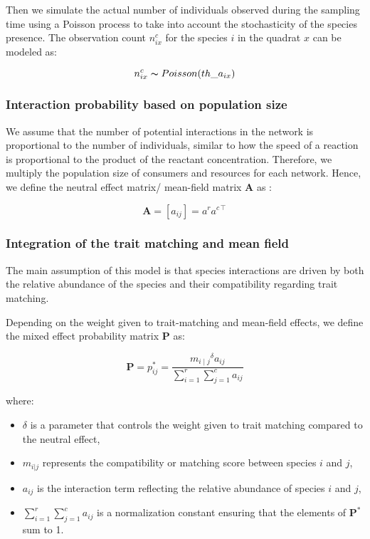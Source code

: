 Then we simulate the actual number of individuals observed during the sampling time using a Poisson process to take into account the stochasticity of the species presence. The observation count $n_{ix}^c$ for the species $i$ in the quadrat $x$ can be modeled as:

$$
    n_{ix}^c \thicksim Poisson(th\_a_{ix})
$$

\subsubsection{Interaction probability based on population size}

We assume that the number of potential interactions in the network is proportional to the number of individuals, similar to how the speed of a reaction is proportional to the product of the reactant concentration. Therefore, we multiply the population size of consumers and resources for each network. 
Hence, we define the neutral effect matrix/ mean-field matrix $\mathbf{A}$ as : 

$$
    \mathbf{A} = [a_{ij}] = a^r a^{c\intercal}
$$

\subsubsection{Integration of the trait matching and mean field}

The main assumption of this model is that species interactions are driven by both the relative abundance of the species and their compatibility regarding trait matching.

Depending on the weight given to trait-matching and mean-field effects, we define the mixed effect probability matrix $\mathbf{P}$ as: 

$$
    \mathbf{P} = p^*_{ij} = \frac{{m_{i\mid j}}^\delta a_{ij}}{\sum_{i=1}^{r} \sum_{j=1}^{c}a_{ij}}
$$
    
where:
\begin{itemize}
\item  $\delta$ is a parameter that controls the weight given to trait matching compared to the neutral effect,
\item  $m_{i|j}$ represents the compatibility or matching score between species \(i\) and \(j\),
\item  $a_{ij}$ is the interaction term reflecting the relative abundance of species \(i\) and \(j\),
\item  $\sum_{i=1}^{r} \sum_{j=1}^{c}a_{ij}$ is a normalization constant ensuring that the elements of \(\mathbf{P}^*\) sum to 1.
\end{itemize}

